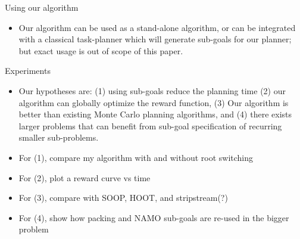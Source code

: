 \documentclass[10pt,letterpaper]{article}
\begin{document}
Using our algorithm
\begin{itemize}
\item Our algorithm can be used as a stand-alone algorithm, or can be integrated
with a classical task-planner which will generate sub-goals
for our planner; but exact usage is out of scope of this paper.
\end{itemize}


Experiments
\begin{itemize}
\item Our hypotheses are: (1) using sub-goals reduce the planning time (2) our algorithm
can globally optimize the reward function, (3) Our algorithm is better than existing
Monte Carlo planning algorithms, and (4) there exists larger problems that can
benefit from sub-goal specification of recurring smaller sub-problems.
\item For (1), compare my algorithm with and without root switching
\item For (2), plot a reward curve vs time
\item For (3), compare with SOOP, HOOT, and stripstream(?)
\item For (4), show how packing and NAMO sub-goals are re-used in the
bigger problem
\end{itemize}



\end{document}
